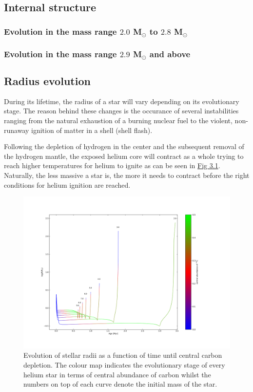 \documentclass[../../main/thesis_msc.tex]{subfiles}
\begin{document}
				\subsection{Internal structure}
				
					\subsubsection{Evolution in the mass range $2.0$ M$_{\odot}$ to $2.8$ M$_{\odot}$}
					
					\subsubsection{Evolution in the mass range $2.9$ M$_{\odot}$ and above}
				
				
				\subsection{Radius evolution}
					During its lifetime, the radius of a star will vary depending on its evolutionary stage. The reason behind these changes is the occurance of several instabilities ranging from the natural exhaustion of a burning nuclear fuel to the violent, non-runaway ignition of matter in a shell (shell flash). 
					
					Following the depletion of hydrogen in the center and the subsequent removal of the hydrogen mantle, the exposed helium core will contract as a whole trying to reach higher temperatures for helium to ignite as can be seen in \hyperref[fig:radii_singles]{Fig 3.1}. Naturally, the less massive a star is, the more it needs to contract before the right conditions for helium ignition are reached.
				
					\begin{figure}[h]
						\centering
						\includegraphics[scale=0.4]{../figures/chapter3/radius_evolution_gradient.png}
						\caption{Evolution of stellar radii as a function of time until central carbon depletion. The colour map indicates the evolutionary stage of every helium star in terms of central abundance of carbon whilst the numbers on top of each curve denote the initial mass of the star.}
						\label{fig:radii_singles}
					\end{figure}
					
\end{document}
